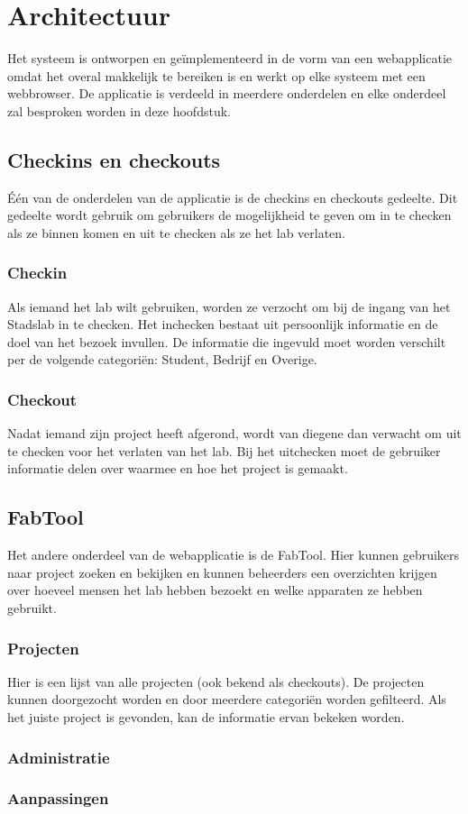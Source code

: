 \chapter{Architectuur}

Het systeem is ontworpen en ge\"implementeerd in de vorm van een webapplicatie omdat het overal makkelijk te bereiken is en werkt op elke systeem met een webbrowser. De applicatie is verdeeld in meerdere onderdelen en elke onderdeel zal besproken worden in deze hoofdstuk.

\section{Checkins en checkouts}

\'E\'en van de onderdelen van de applicatie is de checkins en checkouts gedeelte. Dit gedeelte wordt gebruik om gebruikers de mogelijkheid te geven om in te checken als ze binnen komen en uit te checken als ze het lab verlaten.

\subsection{Checkin}

Als iemand het lab wilt gebruiken, worden ze verzocht om bij de ingang van het Stadslab in te checken. Het inchecken bestaat uit persoonlijk informatie en de doel van het bezoek invullen. De informatie die ingevuld moet worden verschilt per de volgende categori\"en: Student, Bedrijf en Overige.

\subsection{Checkout}

Nadat iemand zijn project heeft afgerond, wordt van diegene dan verwacht om uit te checken voor het verlaten van het lab. Bij het uitchecken moet de gebruiker informatie delen over waarmee en hoe het project is gemaakt.

\section{FabTool}

Het andere onderdeel van de webapplicatie is de FabTool. Hier kunnen gebruikers naar project zoeken en bekijken en kunnen beheerders een overzichten krijgen over hoeveel mensen het lab hebben bezoekt en welke apparaten ze hebben gebruikt.

\subsection{Projecten}

Hier is een lijst van alle projecten (ook bekend als checkouts). De projecten kunnen doorgezocht worden en door meerdere categori\"en worden gefilteerd. Als het juiste project is gevonden, kan de informatie ervan bekeken worden.

\subsection{Administratie}

\subsection{Aanpassingen}